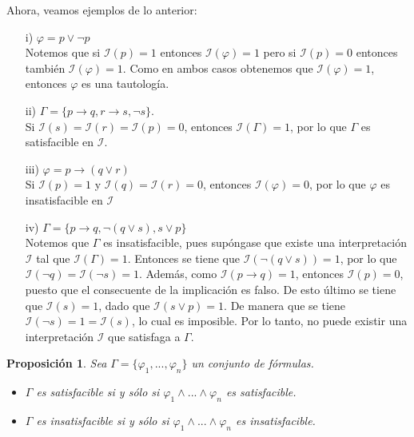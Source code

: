 \documentclass[letterpaper,11pt]{article}
\newtheorem{prop}{Proposición}[]
\begin{document}
    \newpage
    \justify
    Ahora, veamos ejemplos de lo anterior: 
    \begin{itemize}
        \item[i)] $\varphi = p \lor \neg p$ \\
        Notemos que si $\mathcal{I}(p) = 1$ entonces 
        $\mathcal{I}(\varphi) = 1$ pero si $\mathcal{I}(p) = 0$ entonces 
        también $\mathcal{I}(\varphi) = 1$. Como en ambos casos obtenemos 
        que $\mathcal{I}(\varphi) = 1$, entonces $\varphi$ es una tautología.
        \item[ii)] $\Gamma = \{ p \rightarrow q, r \rightarrow s, \neg s\}$.\\
        Si $\mathcal{I}(s) = \mathcal{I}(r) = \mathcal{I}(p) = 0$, entonces 
        $\mathcal{I}(\Gamma) = 1$, por lo que $\Gamma$ es satisfacible en 
        $\mathcal{I}$.
        \item[iii)] $\varphi = p \rightarrow (q \lor r)$ \\
        Si $\mathcal{I}(p) = 1$ y $\mathcal{I}(q) = \mathcal{I}(r) = 0$, 
        entonces $\mathcal{I}(\varphi) = 0$, por lo que $\varphi$ es 
        insatisfacible en $\mathcal{I}$
        \item[iv)] $\Gamma = \{ p \rightarrow q, \neg (q \lor s), s \lor p\}$\\
        Notemos que $\Gamma$ es insatisfacible, pues supóngase que existe una 
        interpretación $\mathcal{I}$ tal que $\mathcal{I}(\Gamma) = 1$. 
        Entonces se tiene que $\mathcal{I}(\neg (q \lor s)) = 1$, por lo que 
        $\mathcal{I}(\neg q) = \mathcal{I}(\neg s) = 1$. Además, como 
        $\mathcal{I}(p \rightarrow q) = 1$, entonces $\mathcal{I}(p) = 0$,
        puesto que el consecuente de la implicación es falso. De esto último 
        se tiene que $\mathcal{I}(s) = 1$, dado que $\mathcal{I}(s \lor p) = 1$.
        De manera que se tiene $\mathcal{I}(\neg s) = 1 = \mathcal{I}(s)$, lo 
        cual es imposible. Por lo tanto, no puede existir una interpretación
        $\mathcal{I}$ que satisfaga a $\Gamma$.
    \end{itemize}

    \justify
    \begin{prop}
        Sea $\Gamma = \{ \varphi_{1},..., \varphi_{n}\}$ un conjunto de 
        fórmulas.
        \begin{itemize}
            \item $\Gamma$ es satisfacible si y sólo si
            $\varphi_{1} \land ... \land \varphi_{n}$ es satisfacible.
            \item $\Gamma$ es insatisfacible si y sólo si 
            $\varphi_{1} \land ... \land \varphi_{n}$ es insatisfacible.
        \end{itemize}
    \end{prop}
\end{document}
